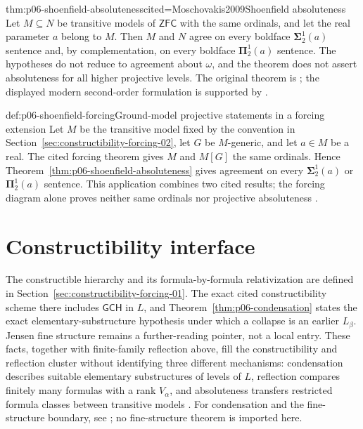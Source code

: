 \begin{hbtheorem}{thm:p06-shoenfield-absoluteness}{cited=Moschovakis2009}{Shoenfield absoluteness}
Let \(M\subseteq N\) be transitive models of \(\mathsf{ZFC}\) with the same
ordinals, and let the real parameter \(a\) belong to \(M\).  Then \(M\) and
\(N\) agree on every boldface \(\boldsymbol\Sigma^1_2(a)\) sentence and,
by complementation, on every boldface \(\boldsymbol\Pi^1_2(a)\) sentence.
The hypotheses do not reduce to agreement about \(\omega\), and the theorem
does not assert absoluteness for all higher projective levels.
The original theorem is \cite{Shoenfield1961}; the displayed modern
second-order formulation is supported by \cite{Moschovakis2009}.
\end{hbtheorem}

\begin{hbexample}{def:p06-shoenfield-forcing}{Ground-model projective statements in a forcing extension}
Let \(M\) be the transitive model fixed by the convention in
Section~\ref{sec:constructibility-forcing-02}, let \(G\) be \(M\)-generic, and let
\(a\in M\) be a real.  The cited forcing theorem gives \(M\) and \(M[G]\) the
same ordinals.  Hence Theorem~\ref{thm:p06-shoenfield-absoluteness} gives
agreement on every
\(\boldsymbol\Sigma^1_2(a)\) or \(\boldsymbol\Pi^1_2(a)\) sentence.  This
application combines two cited results; the forcing diagram alone proves
neither same ordinals nor projective absoluteness
\cite{Jech2003,Moschovakis2009}.
\end{hbexample}

\section{Constructibility interface}
\label{sec:p06-constructibility-interface}

The constructible hierarchy and its formula-by-formula relativization are
defined in Section~\ref{sec:constructibility-forcing-01}.  The exact cited
constructibility scheme there includes \(\mathsf{GCH}\) in \(L\), and
Theorem~\ref{thm:p06-condensation} states the exact elementary-substructure
hypothesis under which a collapse is an earlier \(L_\beta\).  Jensen fine
structure remains a further-reading pointer, not a local entry.  These facts,
together with finite-family reflection above, fill the constructibility and
reflection cluster without identifying three different mechanisms:
condensation describes suitable elementary substructures of levels of \(L\),
reflection compares finitely many formulas with a rank \(V_\alpha\), and
absoluteness transfers restricted formula classes between transitive models
\cite[Chapters~12--13]{Jech2003}.  For condensation and the fine-structure
boundary, see \cite{Devlin1984}; no fine-structure theorem is imported here.

